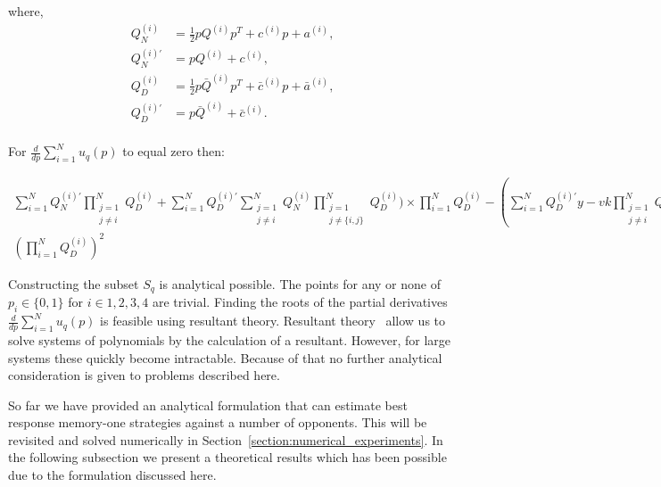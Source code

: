 \documentclass[10pt]{article}
\begin{document}
where,
{\scriptsize
\begin{align*}
    Q_{N}^{(i) } & = \frac{1}{2} pQ^{(i)} p^T + c^{(i)} p + a^ {(i)}, \\
    Q_{N}^{(i)'} & =  pQ^{(i)} + c^{(i)}, \\
    Q_{D}^{(i) } & = \frac{1}{2} p\bar{Q}^{(i)} p^T + \bar{c}^{(i)} p + \bar{a}^ {(i)}, \\
    Q_{D}^{(i)'} & =  p\bar{Q}^{(i)} + \bar{c}^{(i)}. \\
\end{align*}}

For \(\frac{d}{dp} \sum\limits_{i=1} ^ N  u_q(p)\) to equal zero then:

{\scriptsize
\begin{align*}
    \sum\limits_{i=1} ^ {N} Q_{N}^{(i)'} \prod_{\substack{j=1 \\ j \neq i}} ^ N Q_{D}^{(i)}
    + \sum\limits_{i=1} ^ {N} Q_{D}^{(i)'} \sum_{\substack{j=1 \\ j \neq i}} ^ {N} Q_{N}^{(i)}
   \prod_{\substack{j=1 \\ j \neq \{i, j\}}} ^ N Q_{D}^{(i)}) \times
   \prod\limits_{i=1} ^ N Q_{D}^{(i)} - (\sum\limits_{i=1} ^ {N} Q_{D}^{(i)'}y-vk
   \prod_{\substack{j=1 \\ j \neq i}} ^ N Q_{D}^{(i)}) \times
   (\sum\limits_{i=1} ^ {N} Q_{N}^{(i)} \prod_{\substack{j=1 \\ j \neq i}} ^ N Q_{D}^{(i)} &= 0, \quad {while} \\
   (\prod\limits_{i=1} ^ N Q_{D}^{(i)})^{2} &\neq 0.
\end{align*}}

Constructing the subset \(S_q\) is analytical possible. The points for any or
none of \(p_i \in \{0, 1\}\) for \(i \in {1, 2, 3, 4}\) are trivial. Finding the
roots of the partial derivatives \(\frac{d}{dp} \sum\limits_{i=1} ^ N  u_q(p)\)
is feasible using resultant theory. Resultant theory~\cite{Jonsson2005} allow us
to solve systems of polynomials by the calculation of a resultant. However, for
large systems these quickly become intractable. Because of that no further
analytical consideration is given to problems described here.

So far we have provided an analytical formulation that can estimate best
response memory-one strategies against a number of opponents. This will be
revisited and solved numerically in
Section~\ref{section:numerical_experiments}. In the following subsection we
present a theoretical results which has been possible due to the formulation
discussed here.
\end{document}
